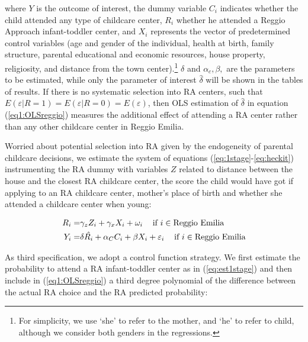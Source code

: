 \documentclass[12pt]{article}
\begin{document}
where $Y$ is the outcome of interest, the dummy variable $C_{i}$ indicates whether the child attended any type of childcare center, $R_{i}$ whether he attended a Reggio Approach infant-toddler center, and $X_{i}$ represents the vector of predetermined control variables (age and gender of the individual, health at birth, family structure, parental educational and economic resources, house property, religiosity, and distance from the town center).\footnote{For simplicity, we use `she' to refer to the mother, and `he' to refer to child, although we consider both genders in the regressions.} $\delta$ and $\alpha_{c}, \beta,$ are the parameters to be estimated, while only the parameter of interest $\hat{\delta}$ will be shown in the tables of results. If there is no systematic selection into RA centers, such that $E(\varepsilon|R=1)=E(\varepsilon|R=0)=E(\varepsilon)$, then OLS estimation of $\hat{\delta}$ in equation (\ref{eq1:OLSreggio}) measures the additional effect of attending a RA center rather than any other childcare center in Reggio Emilia.

\medskip

Worried about potential selection into RA given by the endogeneity of parental childcare decisions, we estimate the system of equations (\ref{eq:1stage}-\ref{eq:heckit}) instrumenting the RA dummy with variables $Z$ related to distance between the house and the closest RA childcare center, the score the child would have got if applying to an RA childcare center, mother's place of birth and whether she attended a childcare center when young:

\begin{align}
R_{i} =& \gamma_{z} Z_{i} + \gamma_{x} X_{i} + \omega_{i} \hspace{2ex} \text{ if } i \in \text{Reggio Emilia} \label{eq:est1stage} \\
Y_{i} =& \delta \hat{R_{i}} + \alpha_{C} C_{i} + \beta X_{i} + \varepsilon_{i} \hspace{2ex} \text{ if } i \in \text{Reggio Emilia} \label{eq2:IVreggio}
\end{align}

\medskip

As third specification, we adopt a control function strategy. We first estimate the probability to attend a RA infant-toddler center as in (\ref{eq:est1stage}) and then include in (\ref{eq1:OLSreggio}) a third degree polynomial of the difference between the actual RA choice and the RA predicted probability:%
\end{document}
